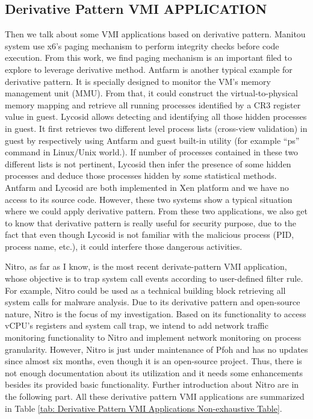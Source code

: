 \subsection{Derivative Pattern VMI APPLICATION}
Then we talk about some VMI applications based on derivative pattern. Manitou system use x6’s paging mechanism to perform integrity checks 
before code execution. From this work, we find paging mechanism is an important filed to explore to leverage derivative method. Antfarm is 
another typical example for derivative pattern. It is specially designed to monitor the VM’s memory management unit (MMU). From that, it could
construct the virtual-to-physical memory mapping and retrieve all running processes identified by a CR3 register value in guest. Lycosid allows
detecting and identifying all those hidden processes in guest. It first retrieves two different level process lists (cross-view validation) in 
guest by respectively using Antfarm and guest built-in utility (for example “ps” command in Linux/Unix world.). If number of processes contained
in these two different lists is not pertinent, Lycosid then infer the presence of some hidden processes and deduce those processes hidden by 
some statistical methods. Antfarm and Lycosid are both implemented in Xen platform and we have no access to its source code. However, these two
systems show a typical situation where we could apply derivative pattern. From these two applications, we also get to know that derivative 
pattern is really useful for security purpose, due to the fact that even though Lycosid is not familiar with the malicious process (PID, 
process name, etc.), it could interfere those dangerous activities.

Nitro, as far as I know, is the most recent derivate-pattern VMI application, whose objective is to trap system call events according to 
user-defined filter rule. For example, Nitro could be used as a technical building block retrieving all system calls for malware analysis. 
Due to its derivative pattern and open-source nature, Nitro is the focus of my investigation. Based on its functionality to access vCPU’s 
registers and system call trap, we intend to add network traffic monitoring functionality to Nitro and implement network monitoring on process 
granularity. However, Nitro is just under maintenance of Pfoh and has no updates since almost six months, even though it is an open-source 
project. Thus, there is not enough documentation about its utilization and it needs some enhancements besides its provided basic functionality.
Further introduction about Nitro are in the following part. All these derivative pattern VMI applications are summarized in Table  
\ref{tab: Derivative Pattern VMI Applications Non-exhaustive Table}.

